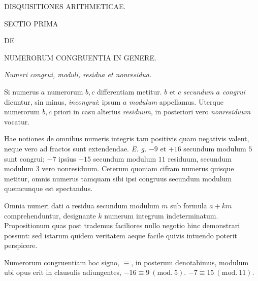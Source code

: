 \begin{center}
{\Large\textsc{DISQUISITIONES ARITHMETICAE.}}

\BookRule{\linewidth}

\textsc{SECTIO PRIMA}

{\scriptsize\textsc{DE}}

\textsc{NUMERORUM CONGRUENTIA IN GENERE.}

\end{center}

\begin{center}
\emph{Numeri congrui, moduli, residua et nonresidua.}
\end{center}


Si numerus $a$ numerorum $b, c$ differentiam metitur. $b$ et $c$ \emph{secundum $a$ congrui} dicuntur, sin minus, \emph{incongrui}: ipsum $a$ \emph{modulum} appellamus. Uterque numerorum $b, c$ priori in casu alterius \emph{residuum}, in posteriori vero \emph{nonresiduum} vocatur.

Hae notiones de omnibus numeris integris tam positivis quam negativis valent, neque vero ad fractos sunt extendendae. \emph{E. g.} $-9$ et $+16$ secundum modulum $5$ sunt congrui; $-7$ ipsius $+15$ secundum modulum $11$ residuum, secundum modulum $3$ vero nonresiduum. Ceterum quoniam cifram numerus quisque metitur, omnis numerus tamquam sibi ipsi congruus secundum modulum quemcunque est spectandus.


Omnia numeri dati $a$ residua secundum modulum $m$ sub formula $a+km$ comprehenduntur, designante $k$ numerum integrum indeterminatum. Propositionum quas post trademus faciliores nullo negotio hinc demonstrari possunt: sed istarum quidem veritatem aeque facile quivis intuendo poterit perspicere.

Numerorum congruentiam hoc signo, $\equiv$, in posterum denotabimus, modulum ubi opus erit in clausulis adiungentes, $-16\equiv 9\ (\mathrm{mod.}\ 5)$. $-7\equiv 15\ (\mathrm{mod.}\ 11)$.

